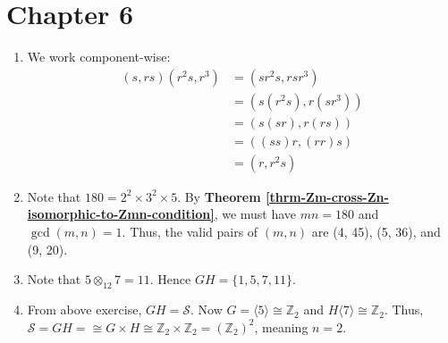 \section*{Chapter 6}
\begin{enumerate}
    \item We work component-wise:
    \begin{align*}
        (s, rs)(r^2s, r^3) &= (sr^2s, rsr^3)\\
        &= (s(r^2s), r(sr^3))\\
        &= (s(sr), r(rs))\\
        &= ((ss)r, (rr)s)\\
        &= (r, r^2s)
    \end{align*}

    \item Note that $180 = 2^2 \times 3^2 \times 5$. By \textbf{Theorem \ref{thrm-Zm-cross-Zn-isomorphic-to-Zmn-condition}}, we must have $mn = 180$ and $\gcd(m, n) = 1$. Thus, the valid pairs of $(m,n)$ are (4, 45), (5, 36), and (9, 20).

    \item Note that $5 \otimes_{12} 7 = 11$. Hence $GH = \{1, 5, 7, 11\}$.

    \item From above exercise, $GH = \mathcal{S}$. Now $G = \langle 5 \rangle \cong \mathbb{Z}_2$ and $H \langle 7 \rangle \cong \mathbb{Z}_2$. Thus, $\mathcal{S} = GH = \cong G \times H \cong \mathbb{Z}_2 \times \mathbb{Z}_2 = (\mathbb{Z}_2)^2$, meaning $n = 2$.
\end{enumerate}

